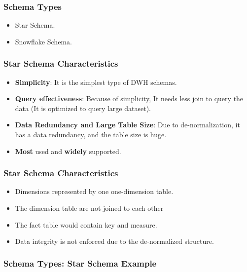 \VideoClassification[column=2, colour=red]

\begin{frame}
\frametitle{Schema Types}
	\begin{itemize}[<+->]
		\item Star Schema.
		\item Snowflake Schema.
	\end{itemize}

\end{frame}
\begin{frame}
	\frametitle{Star Schema Characteristics}
	\begin{itemize}[<+->]
		\item \textbf{Simplicity}: It is the simplest type of DWH schemas.
		\item \textbf{Query effectiveness}: Because of simplicity, It needs less join to query the data (It is optimized to query large dataset).
		\item \textbf{Data Redundancy and Large Table Size}: Due to de-normalization, it has a data redundancy, and the table size is huge.
		\item \textbf{Most} used and \textbf{widely} supported.
	\end{itemize}
\end{frame}
\begin{frame}
\frametitle{Star Schema Characteristics}
	\begin{itemize}[<+->]
		\item Dimensions represented by one one-dimension table.
		\item The dimension table are not joined to each other
		\item The fact table would contain key and measure.
		\item Data integrity is not enforced due to the de-normalized structure.
	\end{itemize}
\end{frame}
\begin{frame}
\frametitle{Schema Types: Star Schema Example}

\end{frame}

